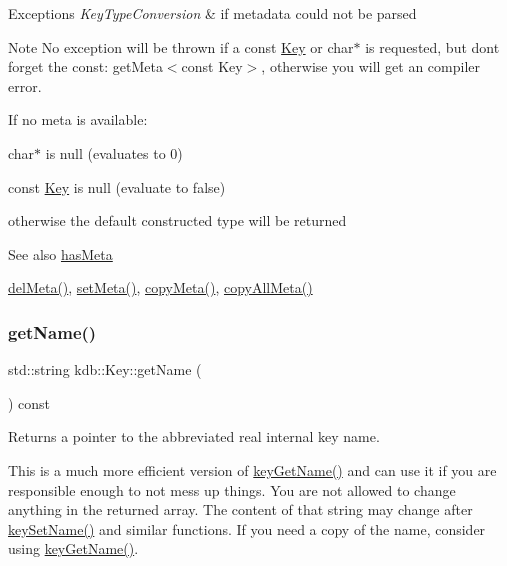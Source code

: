 \begin{DoxyExceptions}{Exceptions}
{\em Key\+Type\+Conversion} & if metadata could not be parsed\\
\hline
\end{DoxyExceptions}
\begin{DoxyNote}{Note}
No exception will be thrown if a const \hyperlink{classkdb_1_1Key}{Key} or char$\ast$ is requested, but don\textquotesingle{}t forget the const\+: get\+Meta$<$const Key$>$, otherwise you will get an compiler error.
\end{DoxyNote}
If no meta is available\+:
\begin{DoxyItemize}
\item char$\ast$ is null (evaluates to 0)
\item const \hyperlink{classkdb_1_1Key}{Key} is null (evaluate to false)
\item otherwise the default constructed type will be returned \begin{DoxySeeAlso}{See also}
\hyperlink{classkdb_1_1Key_ae3c3228bd66be9013a8d686e57aed64b}{has\+Meta}

\hyperlink{classkdb_1_1Key_a2305da805095605aca38d53f2733fb57}{del\+Meta()}, \hyperlink{classkdb_1_1Key_a4c5a3d463127ade0b766c4298002daa3}{set\+Meta()}, \hyperlink{classkdb_1_1Key_a53f6d2196a7f17c4bdc544207bdc5f4c}{copy\+Meta()}, \hyperlink{classkdb_1_1Key_aec0910bf293db33deac6a3f81359cb48}{copy\+All\+Meta()} 
\end{DoxySeeAlso}

\end{DoxyItemize}\mbox{\label{classkdb_1_1Key_a6c1812730e9cb714893c9f9b1e503303}} 
\subsubsection{\texorpdfstring{get\+Name()}{getName()}}
{\footnotesize\ttfamily std\+::string kdb\+::\+Key\+::get\+Name (\begin{DoxyParamCaption}{ }\end{DoxyParamCaption}) const\hspace{0.3cm}{\ttfamily [inline]}}



Returns a pointer to the abbreviated real internal {\ttfamily key} name. 

This is a much more efficient version of \hyperlink{group__keyname_gab29a850168d9b31c9529e90cf9ab68be}{key\+Get\+Name()} and can use it if you are responsible enough to not mess up things. You are not allowed to change anything in the returned array. The content of that string may change after \hyperlink{group__keyname_ga7699091610e7f3f43d2949514a4b35d9}{key\+Set\+Name()} and similar functions. If you need a copy of the name, consider using \hyperlink{group__keyname_gab29a850168d9b31c9529e90cf9ab68be}{key\+Get\+Name()}.


